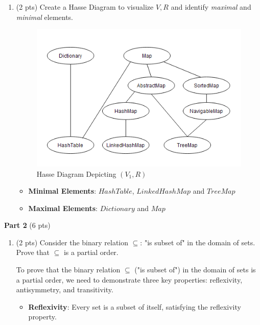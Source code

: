 \documentclass[12pt]{article}
\begin{document}
\begin{spacing}{1.5}
\begin{enumerate}
		\item (2 pts) Create a Hasse Diagram to visualize $V, R$ and identify \textit{maximal} and \textit{minimal} elements.
		      		      
		      \begin{figure}[htp]
		      	\centering
		      	\includegraphics{HasseDiagram_6_3_1.png}
		      	\caption{Hasse Diagram Depicting $(V_1,R)$}
		      	\label{fig:figure}
		      \end{figure}
		      		           
		      \begin{itemize}
		      	\item \textbf{Minimal Elements}: $HashTable$, $LinkedHashMap$ and $TreeMap$
		      	\item \textbf{Maximal Elements}: $Dictionary$ and $Map$
		      \end{itemize}
		      		      		      
	\end{enumerate}
			
	\noindent \textbf{Part 2} (6 pts)
			
	\begin{enumerate}
		\item (2 pts) Consider the binary relation $\subseteq$: "is subset of" in the domain of sets. Prove that $\subseteq$ is a partial order.
		      		      
		      To prove that the binary relation $\subseteq$ ("is subset of") in the domain of sets is a partial order, we need to demonstrate three key properties: reflexivity, antisymmetry, and transitivity.
		      		      
		      \begin{itemize}
		      	\item \textbf{Reflexivity}: Every set is a subset of itself, satisfying the reflexivity property.
		      	      		      	      

\end{itemize}
\end{enumerate}
\end{spacing}
\end{document}
